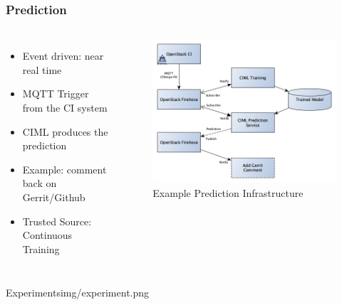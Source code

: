 \documentclass[aspectratio=169,11pt,hyperref={colorlinks=true}]{beamer}
\begin{document}
\begin{frame}
    \frametitle{Prediction}
    \begin{columns}
        \begin{itemize}
            \item{Event driven: near real time}
            \item{MQTT Trigger from the CI system}
            \item{CIML produces the prediction}
            \item{Example: comment back on Gerrit/Github}
            \item{Trusted Source: Continuous Training}
        \end{itemize}
      \begin{figure}
      \begin{center}
        \includegraphics[width=0.9\columnwidth]{diagrams/prediction.png}
           \caption{Example Prediction Infrastructure}
      \end{center}
      \end{figure}
    \end{columns}
\end{frame}

\begin{sectionpic}
{Experiments}{img/experiment.png}
\end{sectionpic}
\end{document}

